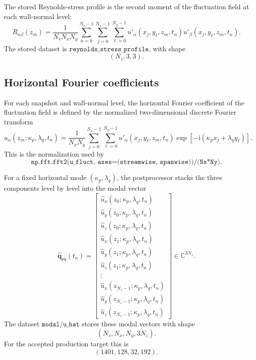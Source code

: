 \documentclass[11pt]{article}
\newcommand{\ii}{\mathrm{i}}
\newcommand{\bfq}{\bm{q}}
\begin{document}
The stored Reynolds-stress profile is the second moment of the fluctuation
field at each wall-normal level:
\begin{equation}
  R_{\alpha\beta}(z_m)
  =
  \frac{1}{N_sN_xN_y}
  \sum_{n=0}^{N_s-1}
  \sum_{j=0}^{N_x-1}
  \sum_{\ell=0}^{N_y-1}
  u'_\alpha(x_j,y_\ell,z_m,t_n)
  u'_\beta(x_j,y_\ell,z_m,t_n).
  \label{eq:reynolds}
\end{equation}
The stored dataset is \(\texttt{reynolds\_stress\_profile}\), with shape
\[
  (N_z,3,3).
\]

\subsection{Horizontal Fourier coefficients}

For each snapshot and wall-normal level, the horizontal Fourier coefficient of
the fluctuation field is defined by the normalized two-dimensional discrete
Fourier transform
\begin{equation}
  \widehat{u}_{\alpha}(z_m;\kappa_p,\lambda_q,t_n)
  =
  \frac{1}{N_xN_y}
  \sum_{j=0}^{N_x-1}
  \sum_{\ell=0}^{N_y-1}
  u'_\alpha(x_j,y_\ell,z_m,t_n)
  \exp\left[-\ii(\kappa_p x_j+\lambda_q y_\ell)\right].
  \label{eq:fft_coeff}
\end{equation}
This is the normalization used by
\[
  \texttt{np.fft.fft2(u\_fluct, axes=(streamwise, spanwise))/(Nx*Ny)}.
\]

For a fixed horizontal mode \((\kappa_p,\lambda_q)\), the postprocessor stacks
the three components level by level into the modal vector
\begin{equation}
  \widehat{\bfq}_{pq}(t_n)
  =
  \begin{bmatrix}
    \widehat{u}_x(z_0;\kappa_p,\lambda_q,t_n)\\
    \widehat{u}_y(z_0;\kappa_p,\lambda_q,t_n)\\
    \widehat{u}_z(z_0;\kappa_p,\lambda_q,t_n)\\
    \widehat{u}_x(z_1;\kappa_p,\lambda_q,t_n)\\
    \widehat{u}_y(z_1;\kappa_p,\lambda_q,t_n)\\
    \widehat{u}_z(z_1;\kappa_p,\lambda_q,t_n)\\
    \vdots\\
    \widehat{u}_x(z_{N_z-1};\kappa_p,\lambda_q,t_n)\\
    \widehat{u}_y(z_{N_z-1};\kappa_p,\lambda_q,t_n)\\
    \widehat{u}_z(z_{N_z-1};\kappa_p,\lambda_q,t_n)
  \end{bmatrix}
  \in\mathbb{C}^{3N_z}.
  \label{eq:modal_vector}
\end{equation}
The dataset \(\texttt{modal/u\_hat}\) stores these modal vectors with shape
\[
  (N_s,N_x,N_y,3N_z).
\]
For the accepted production target this is
\[
  (1401,128,32,192).
\]
\end{document}
